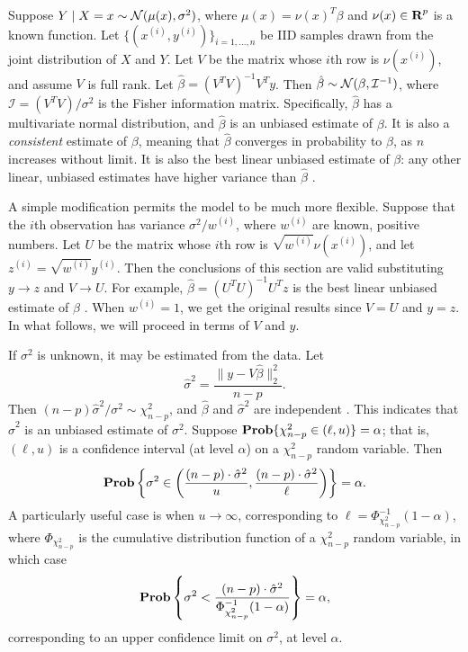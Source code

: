 \documentclass[12pt]{article}
\begin{document}
Suppose $Y \; | \; X = x \sim {\mathcal N} (\mu(x), \sigma^2)$, where $\mu(x) = \nu(x)^T \beta$ and $\nu(x) \in {\mbox{\bf R}}^p$ is a known function. Let $\{ (x^{(i)}, y^{(i)}) \}_{i=1, \ldots, n}$ be IID samples drawn from the joint distribution of $X$ and $Y$. Let $V$ be the matrix whose $i$th row is $\nu(x^{(i)})$, and assume $V$ is full rank. Let $\hat{\beta} = (V^T V)^{-1} V^T y$. Then $\hat{\beta} \sim {\mathcal N} (\beta, \mathcal{I}^{-1})$, where $\mathcal{I} = (V^T V) / \sigma^2$ is the Fisher information matrix. Specifically, $\hat{\beta}$ has a multivariate normal distribution, and $\hat{\beta}$ is an unbiased estimate of $\beta$. It is also a \textit{consistent} estimate of $\beta$, meaning that $\hat{\beta}$ converges in probability to $\beta$, as $n$ increases without limit. It is also the best linear unbiased estimate of $\beta$: any other linear, unbiased estimates have higher variance than $\hat{\beta}$ \cite[\S~1.3.9]{Wood:2017}.

A simple modification permits the model to be much more flexible. Suppose that the $i$th observation has variance $\sigma^2/w^{(i)}$, where $w^{(i)}$ are  known, positive numbers. Let $U$ be the matrix whose $i$th row is $\sqrt{w^{(i)}}\nu(x^{(i)})$, and let $z^{(i)} = \sqrt{w^{(i)}} y^{(i)}$. Then the conclusions of this section are valid substituting $y \to z$ and $V \to U$. For example, $\hat{\beta} = (U^T U)^{-1} U^T z$ is the best linear unbiased estimate of $\beta$ \cite[\S~5.1]{Weisberg:2005}. When $w^{(i)} = 1$, we get the original results since $V=U$ and $y=z$. In what follows, we will proceed in terms of $V$ and $y$.

If $\sigma^2$ is unknown, it may be estimated from the data. Let
\begin{equation}
   \hat{\sigma}^2 = \frac{\| y - V \hat{\beta} \|_2^2}{n-p}.
\end{equation}
Then $(n-p) \hat{\sigma}^2 / \sigma^2 \sim \chi_{n-p}^2$, and $\hat{\beta}$ and $\hat{\sigma}^2$ are independent \cite[\S~3.4.4]{Weisberg:2005}. This indicates that $\hat{\sigma}^2$ is an unbiased estimate of $\sigma^2$. Suppose $\mathop{\bf Prob}\{ \chi_{n-p}^2 \in (\ell, u) \} = \alpha$; that is, $(\ell, u)$ is a confidence interval (at level $\alpha$) on a $\chi_{n-p}^2$ random variable. Then 
\begin{equation}
   \mathop{\bf Prob} \left\{ \sigma^2 \in \left( \frac{(n-p) \cdot \hat{\sigma}^2}{u}, \frac{(n-p) \cdot \hat{\sigma}^2}{\ell} \right) \right\} = \alpha.
\end{equation}
A particularly useful case is when $u \to \infty$, corresponding to $\ell = \Phi_{\chi_{n-p}^2}^{-1}(1 - \alpha)$, where $\Phi_{\chi_{n-p}^2}$ is the cumulative distribution function of a $\chi_{n-p}^2$ random variable, in which case 
\begin{displaymath}
   \mathop{\bf Prob}\left\{\sigma^2 < \frac{(n-p) \cdot \hat{\sigma}^2}{\Phi_{\chi_{n-p}^2}^{-1}(1 - \alpha)} \right\} = \alpha,
\end{displaymath}
corresponding to an upper confidence limit on $\sigma^2$, at level $\alpha$.
\end{document}
